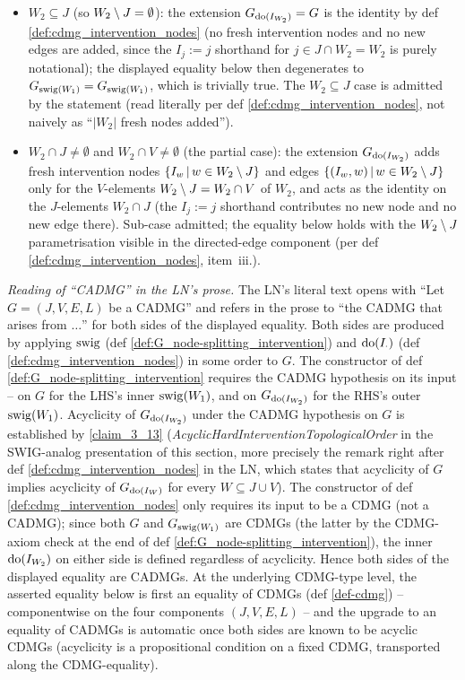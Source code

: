 \documentclass[main]{subfiles}
\begin{document}
\begin{Lem}
    \begin{itemize}
        \item $W_2 \subseteq J$ (so $W_2 \setminus J = \emptyset$): the extension $G_{\operatorname{do}(I_{W_2})} = G$ is the identity by def \ref{def:cdmg_intervention_nodes} (no fresh intervention nodes and no new edges are added, since the $I_j := j$ shorthand for $j \in J \cap W_2 = W_2$ is purely notational); the displayed equality below then degenerates to $G_{\mathrm{swig}(W_1)} = G_{\mathrm{swig}(W_1)}$, which is trivially true. The $W_2 \subseteq J$ case is admitted by the statement (read literally per def \ref{def:cdmg_intervention_nodes}, not naively as ``$|W_2|$ fresh nodes added'').
        \item $W_2 \cap J \neq \emptyset$ and $W_2 \cap V \neq \emptyset$ (the partial case): the extension $G_{\operatorname{do}(I_{W_2})}$ adds fresh intervention nodes $\left \{ I_w \,\middle|\, w \in W_2 \setminus J \right \}$ and edges $\left \{ (I_w, w) \,\middle|\, w \in W_2 \setminus J \right \}$ only for the $V$-elements $W_2 \setminus J = W_2 \cap V$ of $W_2$, and acts as the identity on the $J$-elements $W_2 \cap J$ (the $I_j := j$ shorthand contributes no new node and no new edge there). Sub-case admitted; the equality below holds with the $W_2 \setminus J$ parametrisation visible in the directed-edge component (per def \ref{def:cdmg_intervention_nodes}, item~iii.).
    \end{itemize}

    \emph{Reading of ``CADMG'' in the LN's prose.}
    The LN's literal text opens with ``Let $G = (J, V, E, L)$ be a CADMG'' and refers in the prose to ``the CADMG that arises from $\ldots$'' for both sides of the displayed equality. Both sides are produced by applying $\mathrm{swig}$ (def \ref{def:G_node-splitting_intervention}) and $\operatorname{do}(I_{\cdot})$ (def \ref{def:cdmg_intervention_nodes}) in some order to $G$. The constructor of def \ref{def:G_node-splitting_intervention} requires the CADMG hypothesis on its input -- on $G$ for the LHS's inner $\mathrm{swig}(W_1)$, and on $G_{\operatorname{do}(I_{W_2})}$ for the RHS's outer $\mathrm{swig}(W_1)$. Acyclicity of $G_{\operatorname{do}(I_{W_2})}$ under the CADMG hypothesis on $G$ is established by \ref{claim_3_13} (\emph{AcyclicHardInterventionTopologicalOrder} in the SWIG-analog presentation of this section, more precisely the remark right after def \ref{def:cdmg_intervention_nodes} in the LN, which states that acyclicity of $G$ implies acyclicity of $G_{\operatorname{do}(I_W)}$ for every $W \subseteq J \cup V$). The constructor of def \ref{def:cdmg_intervention_nodes} only requires its input to be a CDMG (not a CADMG); since both $G$ and $G_{\mathrm{swig}(W_1)}$ are CDMGs (the latter by the CDMG-axiom check at the end of def \ref{def:G_node-splitting_intervention}), the inner $\operatorname{do}(I_{W_2})$ on either side is defined regardless of acyclicity. Hence both sides of the displayed equality are CADMGs. At the underlying CDMG-type level, the asserted equality below is first an equality of CDMGs (def \ref{def-cdmg}) -- componentwise on the four components $(J, V, E, L)$ -- and the upgrade to an equality of CADMGs is automatic once both sides are known to be acyclic CDMGs (acyclicity is a propositional condition on a fixed CDMG, transported along the CDMG-equality).


\end{Lem}
\end{document}
